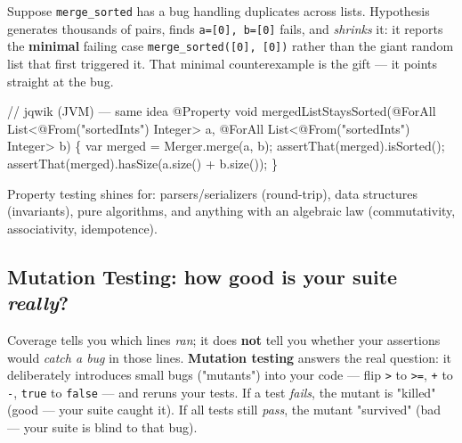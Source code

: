 \documentclass[11pt]{article}
\newenvironment{Shaded}{\begin{snugshade}}{\end{snugshade}}
\newcommand{\AttributeTok}[1]{\textcolor[rgb]{0.16,0.50,0.73}{#1}}
\newcommand{\BuiltInTok}[1]{\textcolor[rgb]{0.50,0.55,0.55}{#1}}
\newcommand{\CommentTok}[1]{\textcolor[rgb]{0.48,0.49,0.49}{#1}}
\newcommand{\DataTypeTok}[1]{\textcolor[rgb]{0.16,0.50,0.73}{#1}}
\newcommand{\FunctionTok}[1]{\textcolor[rgb]{0.56,0.27,0.68}{#1}}
\newcommand{\NormalTok}[1]{\textcolor[rgb]{0.81,0.81,0.76}{#1}}
\newcommand{\OperatorTok}[1]{\textcolor[rgb]{0.81,0.81,0.76}{#1}}
\newcommand{\StringTok}[1]{\textcolor[rgb]{0.96,0.31,0.31}{#1}}
\begin{document}
Suppose \texttt{merge\_sorted} has a bug handling duplicates across lists. Hypothesis generates thousands of pairs, finds \texttt{a={[}0{]},\ b={[}0{]}} fails, and \emph{shrinks} it: it reports the \textbf{minimal} failing case \texttt{merge\_sorted({[}0{]},\ {[}0{]})} rather than the giant random list that first triggered it. That minimal counterexample is the gift --- it points straight at the bug.


\begin{Shaded}
\begin{Highlighting}[]
\CommentTok{// jqwik (JVM) — same idea}
\AttributeTok{@Property}
\DataTypeTok{void} \FunctionTok{mergedListStaysSorted}\OperatorTok{(}\AttributeTok{@ForAll} \BuiltInTok{List}\OperatorTok{\textless{}}\AttributeTok{@From}\OperatorTok{(}\StringTok{"sortedInts"}\OperatorTok{)} \BuiltInTok{Integer}\OperatorTok{\textgreater{}}\NormalTok{ a}\OperatorTok{,}
                           \AttributeTok{@ForAll} \BuiltInTok{List}\OperatorTok{\textless{}}\AttributeTok{@From}\OperatorTok{(}\StringTok{"sortedInts"}\OperatorTok{)} \BuiltInTok{Integer}\OperatorTok{\textgreater{}}\NormalTok{ b}\OperatorTok{)} \OperatorTok{\{}
    \DataTypeTok{var}\NormalTok{ merged }\OperatorTok{=}\NormalTok{ Merger}\OperatorTok{.}\FunctionTok{merge}\OperatorTok{(}\NormalTok{a}\OperatorTok{,}\NormalTok{ b}\OperatorTok{);}
    \FunctionTok{assertThat}\OperatorTok{(}\NormalTok{merged}\OperatorTok{).}\FunctionTok{isSorted}\OperatorTok{();}
    \FunctionTok{assertThat}\OperatorTok{(}\NormalTok{merged}\OperatorTok{).}\FunctionTok{hasSize}\OperatorTok{(}\NormalTok{a}\OperatorTok{.}\FunctionTok{size}\OperatorTok{()} \OperatorTok{+}\NormalTok{ b}\OperatorTok{.}\FunctionTok{size}\OperatorTok{());}
\OperatorTok{\}}
\end{Highlighting}
\end{Shaded}

Property testing shines for: parsers/serializers (round-trip), data structures (invariants), pure algorithms, and anything with an algebraic law (commutativity, associativity, idempotence).

\subsection{\texorpdfstring{Mutation Testing: how good is your suite \emph{really}?}{Mutation Testing: how good is your suite really?}}\label{mutation-testing-how-good-is-your-suite-really}

Coverage tells you which lines \emph{ran}; it does \textbf{not} tell you whether your assertions would \emph{catch a bug} in those lines. \textbf{Mutation testing} answers the real question: it deliberately introduces small bugs ("mutants") into your code --- flip \texttt{\textgreater{}} to \texttt{\textgreater{}=}, \texttt{+} to \texttt{-}, \texttt{true} to \texttt{false} --- and reruns your tests. If a test \emph{fails}, the mutant is "killed" (good --- your suite caught it). If all tests still \emph{pass}, the mutant "survived" (bad --- your suite is blind to that bug).
\end{document}
